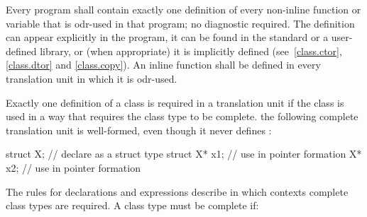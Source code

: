 \pnum
Every program shall contain exactly one definition of every non-inline
function or variable that is odr-used in that program; no diagnostic required.
The definition can appear explicitly in the program, it can be found in
the standard or a user-defined library, or (when appropriate) it is
implicitly defined (see~\ref{class.ctor}, \ref{class.dtor} and
\ref{class.copy}). An inline function shall be defined in every
translation unit in which it is odr-used.

\pnum
{}%
Exactly one definition of a class is required in a translation unit if
the class is used in a way that requires the class type to be complete.
\enterexample the following complete translation unit is well-formed,
even though it never defines :

\begin{codeblock}
struct X;                       // declare  as a struct type
struct X* x1;                   // use  in pointer formation
X* x2;                          // use  in pointer formation
\end{codeblock}
\exitexample
\enternote The rules for declarations and expressions
describe in which contexts complete class types are required. A class
type  must be complete if:

